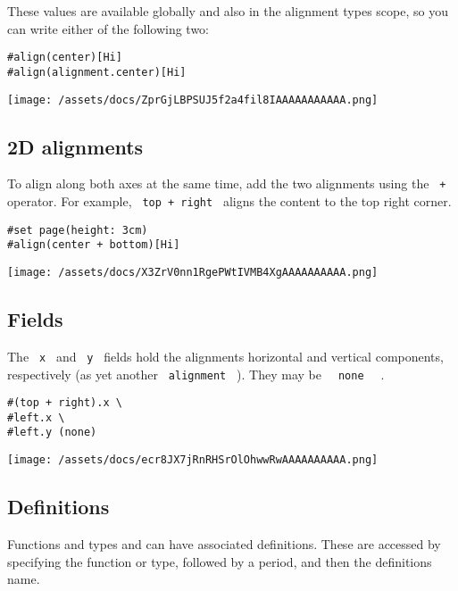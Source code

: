 These values are available globally and also in the alignment
type\textquotesingle s scope, so you can write either of the following
two:

\begin{verbatim}
#align(center)[Hi]
#align(alignment.center)[Hi]
\end{verbatim}

\texttt{[image: /assets/docs/ZprGjLBPSUJ5f2a4fil8IAAAAAAAAAAA.png]}

\subsection{2D alignments}\label{2d-alignments}

To align along both axes at the same time, add the two alignments using
the \texttt{\ +\ } operator. For example, \texttt{\ top\ +\ right\ }
aligns the content to the top right corner.

\begin{verbatim}
#set page(height: 3cm)
#align(center + bottom)[Hi]
\end{verbatim}

\texttt{[image: /assets/docs/X3ZrV0nn1RgePWtIVMB4XgAAAAAAAAAA.png]}

\subsection{Fields}\label{fields}

The \texttt{\ x\ } and \texttt{\ y\ } fields hold the
alignment\textquotesingle s horizontal and vertical components,
respectively (as yet another \texttt{\ alignment\ } ). They may be
\texttt{\ }{\texttt{\ none\ }}\texttt{\ } .

\begin{verbatim}
#(top + right).x \
#left.x \
#left.y (none)
\end{verbatim}

\texttt{[image: /assets/docs/ecr8JX7jRnRHSrOlOhwwRwAAAAAAAAAA.png]}

\subsection{\texorpdfstring{{ Definitions
}}{ Definitions }}\label{definitions}

\label{definitions-tooltip}
Functions and types and can have associated definitions. These are
accessed by specifying the function or type, followed by a period, and
then the definition\textquotesingle s name.

